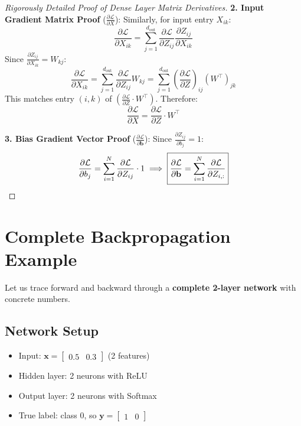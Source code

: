 \documentclass[12pt, a4paper]{report}
\theoremstyle{definition}
\begin{document}
\begin{proof}[Rigorously Detailed Proof of Dense Layer Matrix Derivatives]
\textbf{2. Input Gradient Matrix Proof} ($\frac{\partial \mathcal{L}}{\partial X}$):
Similarly, for input entry $X_{ik}$:
\begin{equation}
    \frac{\partial \mathcal{L}}{\partial X_{ik}} = \sum_{j=1}^{d_\text{out}} \frac{\partial \mathcal{L}}{\partial Z_{ij}} \frac{\partial Z_{ij}}{\partial X_{ik}}
\end{equation}
Since $\frac{\partial Z_{ij}}{\partial X_{ik}} = W_{kj}$:
\begin{equation}
    \frac{\partial \mathcal{L}}{\partial X_{ik}} = \sum_{j=1}^{d_\text{out}} \frac{\partial \mathcal{L}}{\partial Z_{ij}} W_{kj} = \sum_{j=1}^{d_\text{out}} \left(\frac{\partial \mathcal{L}}{\partial Z}\right)_{ij} (W^\top)_{jk}
\end{equation}
This matches entry $(i, k)$ of $(\frac{\partial \mathcal{L}}{\partial Z} \cdot W^\top)$. Therefore:
\begin{equation}
    \boxed{\frac{\partial \mathcal{L}}{\partial X} = \frac{\partial \mathcal{L}}{\partial Z} \cdot W^\top}
\end{equation}

\textbf{3. Bias Gradient Vector Proof} ($\frac{\partial \mathcal{L}}{\partial \mathbf{b}}$):
Since $\frac{\partial Z_{ij}}{\partial b_j} = 1$:
\begin{equation}
    \frac{\partial \mathcal{L}}{\partial b_j} = \sum_{i=1}^{N} \frac{\partial \mathcal{L}}{\partial Z_{ij}} \cdot 1 \implies \boxed{\frac{\partial \mathcal{L}}{\partial \mathbf{b}} = \sum_{i=1}^{N} \frac{\partial \mathcal{L}}{\partial Z_{i,:}}} \qedhere
\end{equation}
\end{proof}

\section{Complete Backpropagation Example}

Let us trace forward and backward through a \textbf{complete 2-layer network} with concrete numbers.

\subsection{Network Setup}

\begin{itemize}
    \item Input: $\mathbf{x} = \begin{bmatrix} 0.5 & 0.3 \end{bmatrix}$ (2 features)
    \item Hidden layer: 2 neurons with ReLU
    \item Output layer: 2 neurons with Softmax
    \item True label: class 0, so $\mathbf{y} = \begin{bmatrix} 1 & 0 \end{bmatrix}$
\end{itemize}
\end{document}
